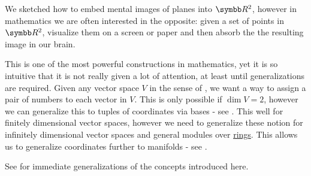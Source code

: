 \begin{Remark}\label{remark:coordinate_systems}
  We sketched how to embed mental images of planes into \( \BR^2 \), however in mathematics we are often interested in the opposite: given a set of points in \( \BR^2 \), visualize them on a screen or paper and then absorb the the resulting image in our brain.

  This is one of the most powerful constructions in mathematics, yet it is so intuitive that it is not really given a lot of attention, at least until generalizations are required. Given any vector space \( V \) in the sense of , we want a way to assign a pair of numbers to each vector in \( V \). This is only possible if \( \dim V = 2 \), however we can generalize this to tuples of coordinates via bases - see . This well for finitely dimensional vector spaces, however we need to generalize these notion for infinitely dimensional vector spaces and general modules over \hyperref[def:left_module]{rings}. This allows us to generalize coordinates further to manifolds - see .

  See  for immediate generalizations of the concepts introduced here.
\end{Remark}
